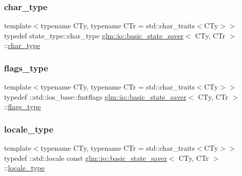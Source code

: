 \subsubsection{\texorpdfstring{char\+\_\+type}{char\_type}}
{\footnotesize\ttfamily template$<$typename C\+Ty, typename C\+Tr = std\+::char\+\_\+traits$<$\+C\+Ty$>$$>$ \\
typedef state\+\_\+type\+::char\+\_\+type \hyperlink{classglm_1_1io_1_1basic__state__saver}{glm\+::io\+::basic\+\_\+state\+\_\+saver}$<$ C\+Ty, C\+Tr $>$\+::\hyperlink{classglm_1_1io_1_1basic__state__saver_ae6abb8e2e6bd4a044e953746691ffe8e}{char\+\_\+type}\hspace{0.3cm}{\ttfamily [private]}}

\mbox{\label{classglm_1_1io_1_1basic__state__saver_a73ca8320543524c7ab7f1ce97d30aff6}} 
\subsubsection{\texorpdfstring{flags\+\_\+type}{flags\_type}}
{\footnotesize\ttfamily template$<$typename C\+Ty, typename C\+Tr = std\+::char\+\_\+traits$<$\+C\+Ty$>$$>$ \\
typedef \+::std\+::ios\+\_\+base\+::fmtflags \hyperlink{classglm_1_1io_1_1basic__state__saver}{glm\+::io\+::basic\+\_\+state\+\_\+saver}$<$ C\+Ty, C\+Tr $>$\+::\hyperlink{classglm_1_1io_1_1basic__state__saver_a73ca8320543524c7ab7f1ce97d30aff6}{flags\+\_\+type}\hspace{0.3cm}{\ttfamily [private]}}

\mbox{\label{classglm_1_1io_1_1basic__state__saver_acc657f13df9c1fd68e1014b96ff615cb}} 
\subsubsection{\texorpdfstring{locale\+\_\+type}{locale\_type}}
{\footnotesize\ttfamily template$<$typename C\+Ty, typename C\+Tr = std\+::char\+\_\+traits$<$\+C\+Ty$>$$>$ \\
typedef \+::std\+::locale const \hyperlink{classglm_1_1io_1_1basic__state__saver}{glm\+::io\+::basic\+\_\+state\+\_\+saver}$<$ C\+Ty, C\+Tr $>$\+::\hyperlink{classglm_1_1io_1_1basic__state__saver_acc657f13df9c1fd68e1014b96ff615cb}{locale\+\_\+type}\hspace{0.3cm}{\ttfamily [private]}}

